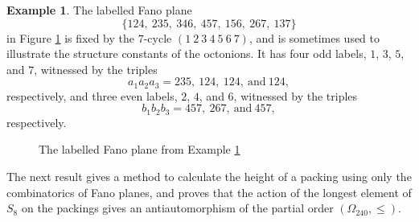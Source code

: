 \documentclass{amsart}
\theoremstyle{plain}
\theoremstyle{definition}
\newtheorem{exa}[theorem]{Example}
\theoremstyle{remark}
\numberwithin{equation}{section}
\newcommand{\qpx}{\Omega_{240}}
\begin{document}
\begin{exa}\label{exa:oddeven}
The labelled Fano plane $$
\{124, \ 235, \ 346, \ 457, \ 156, \ 267, \ 137\}
$$ in Figure \ref{fig:oddeven} is fixed by the $7$-cycle $(1\ 2\ 3\ 4\ 5\ 6\ 7)$, and is sometimes used to illustrate the 
structure constants of the octonions. It has four odd labels, $1$, $3$, $5$, and $7$, witnessed by the triples $$
a_1 a_2 a_3 = 235, \ 124, \ 124, \ \text{and} \ 124
,$$ respectively, and three even labels, $2$, $4$, and $6$, witnessed by the triples $$
b_1 b_2 b_3 = 457, \ 267,\ \text{and}\ 457,
$$ respectively.

\begin{figure}
\begin{center}
    \caption{The labelled Fano plane from Example \ref{exa:oddeven}}
\label{fig:oddeven}
\end{center}
\end{figure}
\end{exa}

The next result gives a method to calculate the height of a packing using only the combinatorics of Fano planes,
and proves that the action of the longest element of $S_8$ on the packings gives an antiautomorphism of
the partial order $(\qpx, \leq)$.
\end{document}
